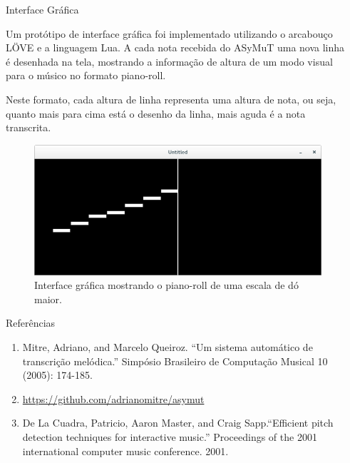 \documentclass[final,hyperref={pdfpagelabels=false}]{beamer}
\begin{document}
\begin{frame}[t]
\begin{columns}[t]
\begin{column}{.465\textwidth}
\begin{block}{Interface Gráfica}

Um protótipo de interface gráfica foi implementado utilizando o arcabouço LÖVE e a linguagem Lua. A cada nota recebida do ASyMuT uma nova linha é desenhada na tela, mostrando a informação de altura de um modo visual para o músico no formato piano-roll.

Neste formato, cada altura de linha representa uma altura de nota, ou seja, quanto mais para cima está o desenho da linha, mais aguda é a nota transcrita.
\begin{figure}%
    \centering
    \includegraphics[width=0.6\linewidth]{screen2.png}
    \caption{Interface gráfica mostrando o piano-roll de uma escala de dó maior.}
    \end{figure}



\end{block}


\begin{block}{Referências}

\begin{enumerate}
\item Mitre, Adriano, and Marcelo Queiroz. ``Um sistema automático de transcrição melódica.'' Simpósio Brasileiro de Computação Musical 10 (2005): 174-185.

\item \url{https://github.com/adrianomitre/asymut}

\item De La Cuadra, Patricio, Aaron Master, and Craig Sapp.``Efficient pitch detection techniques for interactive music.'' Proceedings of the 2001 international computer music conference. 2001.
\end{enumerate}

\end{block}


\end{column} %

\begin{column}{.015\textwidth}\end{column} %

\end{columns} %

\end{frame} %
\end{document}
